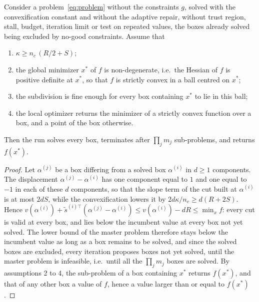 \documentclass[pdflatex,sn-basic]{sn-jnl}
\begin{document}
\begin{proposition}\label{prop:convergence}
  Consider a problem~\eqref{eq:problem} without the constraints $g$, solved
  with the convexification constant and without the adaptive repair, without
  trust region, stall, budget, iteration limit or test on repeated values, the
  boxes already solved being excluded by no-good constraints. Assume that
  \begin{enumerate}
    \item $\kappa \ge n_c\,(R/2 + S)$;
    \item the global minimizer $x^\ast$ of $f$ is non-degenerate, i.e.\ the
      Hessian of $f$ is positive definite at $x^\ast$, so that $f$ is strictly
      convex in a ball centred on $x^\ast$;
    \item the subdivision is fine enough for every box containing $x^\ast$ to
      lie in this ball;
    \item the local optimizer returns the minimizer of a strictly convex
      function over a box, and a point of the box otherwise.
  \end{enumerate}
  Then the run solves every box, terminates after $\prod_j m_j$ sub-problems,
  and returns $f(x^\ast)$.
\end{proposition}

\begin{proof}
  Let $\alpha^{(j)}$ be a box differing from a solved box $\alpha^{(i)}$ in
  $d \ge 1$ components. The displacement $\alpha^{(j)} - \alpha^{(i)}$ has one
  component equal to $1$ and one equal to $-1$ in each of these $d$ components,
  so that the slope term of the cut built at $\alpha^{(i)}$ is at most $2dS$,
  while the convexification lowers it by $2d\kappa/n_c \ge d(R + 2S)$. Hence
  $v(\alpha^{(i)}) + \tilde s^{(i)\top}(\alpha^{(j)} - \alpha^{(i)}) \le
  v(\alpha^{(i)}) - dR \le \min_x f$: every cut is valid at every box, and lies
  below the incumbent value at every box not yet solved. The lower bound of the
  master problem therefore stays below the incumbent value as long as a box
  remains to be solved, and since the solved boxes are excluded, every
  iteration proposes boxes not yet solved, until the master problem is
  infeasible, i.e.\ until all the $\prod_j m_j$ boxes are solved. By
  assumptions 2 to 4, the sub-problem of a box containing $x^\ast$ returns
  $f(x^\ast)$, and that of any other box a value of $f$, hence a value larger
  than or equal to $f(x^\ast)$.
\end{proof}
\end{document}
